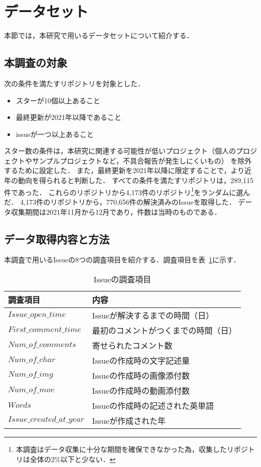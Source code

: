 \section{データセット}
本節では，本研究で用いるデータセットについて紹介する．

\subsection{本調査の対象}
次の条件を満たすリポジトリを対象とした．
\begin{itemize}
    \item スターが10個以上あること
    \item 最終更新が2021年以降であること
    \item issueが一つ以上あること
\end{itemize}
スター数の条件は，本研究に関連する可能性が低いプロジェクト（個人のプロジェクトやサンプルプロジェクトなど，不具合報告が発生しにくいもの）
を除外するために設定した．
また，最終更新を2021年以降に限定することで，より近年の動向を得られると判断した．
すべての条件を満たすリポジトリは，289,115件であった．
これらのリポジトリから4,173件のリポジトリ\footnote{本調査はデータ収集に十分な期間を確保できなかった為，収集したリポジトリは全体の2\%以下と少ない．}をランダムに選んだ．
4,173件のリポジトリから，770,656件の解決済みのIssueを取得した．
データ収集期間は2021年11月から12月であり，件数は当時のものである．

\subsection{データ取得内容と方法}
本調査で用いるIssueの8つの調査項目を紹介する．調査項目を表~\ref{issue_parameter}に示す．

\begin{table}[t]
    \begin{center}
    \caption{Issueの調査項目}
    \renewcommand{\arraystretch}{1.3}
    \begin{tabular}{l|l} 
        \hline
        調査項目 & 内容 \\ 
        \hline \hline
        $Issue\_open\_time$ & Issueが解決するまでの時間（日） \\
        $First\_comment\_time$ & 最初のコメントがつくまでの時間（日） \\
        $Num\_of\_comments$ & 寄せられたコメント数 \\
        $Num\_of\_char$ & Issueの作成時の文字記述量 \\
        $Num\_of\_img$ & Issueの作成時の画像添付数 \\
        $Num\_of\_mov$ & Issueの作成時の動画添付数 \\
        $Words$ & Issueの作成時の記述された英単語 \\
        $Issue\_created\_at\_year$ & Issueが作成された年 \\
        \hline
    \end{tabular}
    \label{issue_parameter}
    \end{center}
\end{table}


